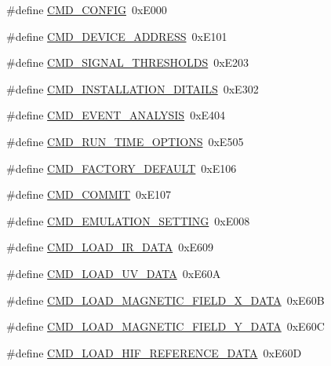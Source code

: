 \begin{DoxyCompactItemize}
\item 
\#define \hyperlink{a00021_aa87bfa4fccf7f7a4fc45afb1966a655f}{C\+M\+D\+\_\+\+C\+O\+N\+F\+I\+G}~0x\+E000
\item 
\#define \hyperlink{a00021_a7c6a5f4023cb02d02f2ded23147be425}{C\+M\+D\+\_\+\+D\+E\+V\+I\+C\+E\+\_\+\+A\+D\+D\+R\+E\+S\+S}~0x\+E101
\item 
\#define \hyperlink{a00021_ac361dc1b32c1036394be0fd7de1182ca}{C\+M\+D\+\_\+\+S\+I\+G\+N\+A\+L\+\_\+\+T\+H\+R\+E\+S\+H\+O\+L\+D\+S}~0x\+E203
\item 
\#define \hyperlink{a00021_af91ff280feea1f52e3bdd7f0f556d153}{C\+M\+D\+\_\+\+I\+N\+S\+T\+A\+L\+L\+A\+T\+I\+O\+N\+\_\+\+D\+I\+T\+A\+I\+L\+S}~0x\+E302
\item 
\#define \hyperlink{a00021_a3a15793e3ab7817f2429edf04de693a0}{C\+M\+D\+\_\+\+E\+V\+E\+N\+T\+\_\+\+A\+N\+A\+L\+Y\+S\+I\+S}~0x\+E404
\item 
\#define \hyperlink{a00021_a1d8673a7ca545f3e382fc538f543ab72}{C\+M\+D\+\_\+\+R\+U\+N\+\_\+\+T\+I\+M\+E\+\_\+\+O\+P\+T\+I\+O\+N\+S}~0x\+E505
\item 
\#define \hyperlink{a00021_a8ad7dae51114833acbb665d703d8ffeb}{C\+M\+D\+\_\+\+F\+A\+C\+T\+O\+R\+Y\+\_\+\+D\+E\+F\+A\+U\+L\+T}~0x\+E106
\item 
\#define \hyperlink{a00021_a7df85bf97a6a032220d7a71c78be5206}{C\+M\+D\+\_\+\+C\+O\+M\+M\+I\+T}~0x\+E107
\item 
\#define \hyperlink{a00021_a230386ac00f9c01793857101e1680324}{C\+M\+D\+\_\+\+E\+M\+U\+L\+A\+T\+I\+O\+N\+\_\+\+S\+E\+T\+T\+I\+N\+G}~0x\+E008
\item 
\#define \hyperlink{a00021_a8c7ce698ee79d20e30eb0ac08f0d9abc}{C\+M\+D\+\_\+\+L\+O\+A\+D\+\_\+\+I\+R\+\_\+\+D\+A\+T\+A}~0x\+E609
\item 
\#define \hyperlink{a00021_a8904f57ef5850374dbcdbe67eb8a5543}{C\+M\+D\+\_\+\+L\+O\+A\+D\+\_\+\+U\+V\+\_\+\+D\+A\+T\+A}~0x\+E60\+A
\item 
\#define \hyperlink{a00021_a9e5d9d302e44daccbe233d321696b12c}{C\+M\+D\+\_\+\+L\+O\+A\+D\+\_\+\+M\+A\+G\+N\+E\+T\+I\+C\+\_\+\+F\+I\+E\+L\+D\+\_\+\+X\+\_\+\+D\+A\+T\+A}~0x\+E60\+B
\item 
\#define \hyperlink{a00021_ace011e2ba41b184650e8bd0ddbfa00d2}{C\+M\+D\+\_\+\+L\+O\+A\+D\+\_\+\+M\+A\+G\+N\+E\+T\+I\+C\+\_\+\+F\+I\+E\+L\+D\+\_\+\+Y\+\_\+\+D\+A\+T\+A}~0x\+E60\+C
\item 
\#define \hyperlink{a00021_afc4f83cb04e57ee185a039b10e19e297}{C\+M\+D\+\_\+\+L\+O\+A\+D\+\_\+\+H\+I\+F\+\_\+\+R\+E\+F\+E\+R\+E\+N\+C\+E\+\_\+\+D\+A\+T\+A}~0x\+E60\+D

\end{DoxyCompactItemize}

